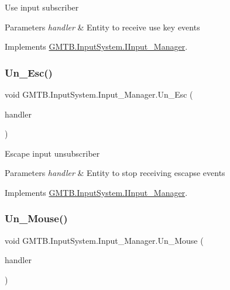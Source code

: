 Use input subscriber 


\begin{DoxyParams}{Parameters}
{\em handler} & Entity to receive use key events\\
\hline
\end{DoxyParams}


Implements \mbox{\hyperlink{interface_g_m_t_b_1_1_input_system_1_1_i_input___manager_aabf7ae758c992a439b018f2c10937b90}{G\+M\+T\+B.\+Input\+System.\+I\+Input\+\_\+\+Manager}}.

\mbox{\label{class_g_m_t_b_1_1_input_system_1_1_input___manager_a949303424f450dabf798922c7868c9e7}} 
\subsubsection{\texorpdfstring{Un\_Esc()}{Un\_Esc()}}
{\footnotesize\ttfamily void G\+M\+T\+B.\+Input\+System.\+Input\+\_\+\+Manager.\+Un\+\_\+\+Esc (\begin{DoxyParamCaption}\item[{Event\+Handler$<$ \mbox{\hyperlink{class_g_m_t_b_1_1_input_system_1_1_input_event}{Input\+Event}} $>$}]{handler }\end{DoxyParamCaption})}



Escape input unsubscriber 


\begin{DoxyParams}{Parameters}
{\em handler} & Entity to stop receiving escapse events\\
\hline
\end{DoxyParams}


Implements \mbox{\hyperlink{interface_g_m_t_b_1_1_input_system_1_1_i_input___manager_af635a3053e7dc57db847c9c98b122547}{G\+M\+T\+B.\+Input\+System.\+I\+Input\+\_\+\+Manager}}.

\mbox{\label{class_g_m_t_b_1_1_input_system_1_1_input___manager_a7f3fda3da96c231d003ec39a4e884832}} 
\subsubsection{\texorpdfstring{Un\_Mouse()}{Un\_Mouse()}}
{\footnotesize\ttfamily void G\+M\+T\+B.\+Input\+System.\+Input\+\_\+\+Manager.\+Un\+\_\+\+Mouse (\begin{DoxyParamCaption}\item[{Event\+Handler$<$ \mbox{\hyperlink{class_g_m_t_b_1_1_input_system_1_1_mouse_event}{Mouse\+Event}} $>$}]{handler }\end{DoxyParamCaption})}



